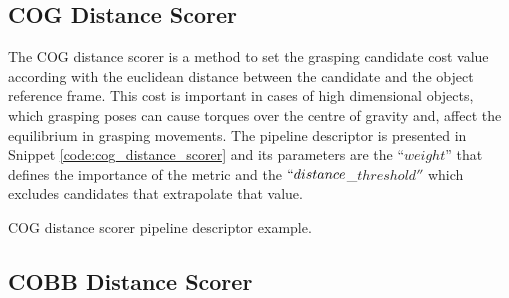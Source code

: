 \subsection{\acl{COG} Distance Scorer}
\label{cap4:modular_grasping_architecture:sec:grasp_selection:subsec:cog_distance}

The \ac{COG} distance scorer is a method to set the grasping candidate cost value according with the euclidean distance between the candidate and the object reference frame. This cost is important in cases of high dimensional objects, which grasping poses can cause torques over the centre of gravity and, affect the equilibrium in grasping movements. The pipeline descriptor is presented in Snippet \ref{code:cog_distance_scorer} and its parameters are the ``$weight$'' that defines the importance of the metric and the $``distance$\_$threshold''$ which excludes candidates that extrapolate that value.



\begin{snippet}[h!]
\centering
{}
\caption{\ac{COG} distance scorer pipeline descriptor example.}
\label{code:cog_distance_scorer}
\end{snippet}

\subsection{\acl{COBB} Distance Scorer}
\label{cap4:modular_grasping_architecture:sec:grasp_selection:subsec:cobb_distance}

